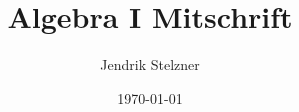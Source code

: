 \documentclass[a4paper,10pt]{book}
\begin{document}
\title{\sc Algebra I Mitschrift}
\author{Jendrik Stelzner}
\date{\today}

\frontmatter
\maketitle

\tableofcontents


\mainmatter


\end{document}
